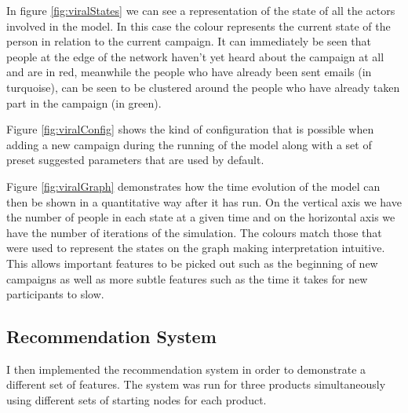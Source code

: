 \documentclass[12pt,a4paper]{article}
\begin{document}
In figure \ref{fig:viralStates} we can see a representation of the state of all the actors involved in the model. In this case the colour represents the current state of the person in relation to the current campaign. It can immediately be seen that people at the edge of the network haven't yet heard about the campaign at all and are in red, meanwhile the people who have already been sent emails (in turquoise), can be seen to be clustered around the people who have already taken part in the campaign (in green).

Figure \ref{fig:viralConfig} shows the kind of configuration that is possible when adding a new campaign during the running of the model along with a set of preset suggested parameters that are used by default.

Figure \ref{fig:viralGraph} demonstrates how the time evolution of the model can then be shown in a quantitative way after it has run. On the vertical axis we have the number of people in each state at a given time and on the horizontal axis we have the number of iterations of the simulation. The colours match those that were used to represent the states on the graph making interpretation intuitive. This allows important features to be picked out such as the beginning of new campaigns as well as more subtle features such as the time it takes for new participants to slow.

\subsection{Recommendation System}
\noindent
I then implemented the recommendation system in order to demonstrate a different set of features. The system was run for three products simultaneously using different sets of starting nodes for each product.
\end{document}
